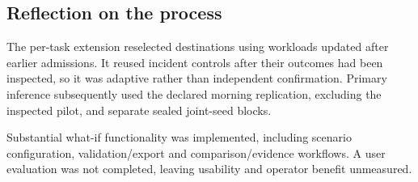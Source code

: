 \documentclass[12pt,a4paper]{article}
\begin{document}
\FloatBarrier
\subsection{Reflection on the process}\label{sec:4.5}

The per-task extension reselected destinations using workloads updated after earlier admissions. It reused incident controls after their outcomes had been inspected, so it was adaptive rather than independent confirmation. Primary inference subsequently used the declared morning replication, excluding the inspected pilot, and separate sealed joint-seed blocks.

Substantial what-if functionality was implemented, including scenario configuration, validation/export and comparison/evidence workflows. A user evaluation was not completed, leaving usability and operator benefit unmeasured.




\end{document}
